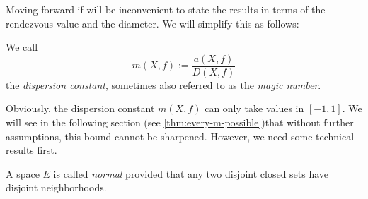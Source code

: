 Moving forward if will be inconvenient to state the results in terms of the rendezvous value and the diameter. We will simplify this as follows:
\begin{definition}
	We call 
	\[m(X,f):=\frac{a(X,f)}{D(X,f)}
	\]
	the \emph{dispersion constant}, sometimes also referred to as the \emph{magic number}.
\end{definition}

Obviously, the dispersion constant $m(X,f)$ can only take values in $[-1,1]$. We will see in the following section (see \autoref{thm:every-m-possible})that without further assumptions, this bound cannot be sharpened. However, we need some technical results first. 

\begin{definition}
	A space $E$ is called \emph{normal} provided that any two disjoint closed sets have disjoint neighborhoods.
\end{definition}

